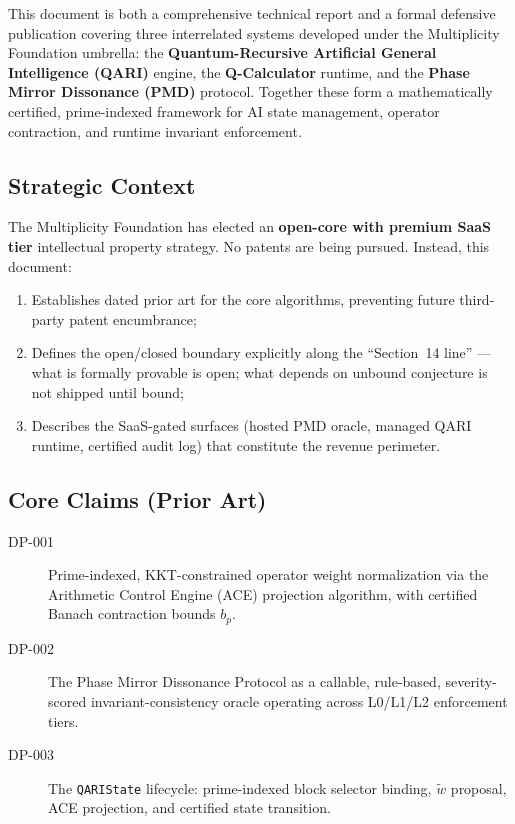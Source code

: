 \documentclass[12pt,letterpaper]{article}
\begin{document}
This document is both a comprehensive technical report and a formal
defensive publication covering three interrelated systems developed
under the Multiplicity Foundation umbrella: the
\textbf{Quantum-Recursive Artificial General Intelligence (QARI)}
engine, the \textbf{Q-Calculator} runtime, and the \textbf{Phase Mirror
Dissonance (PMD)} protocol. Together these form a mathematically
certified, prime-indexed framework for AI state management, operator
contraction, and runtime invariant enforcement.

\subsection{Strategic Context}

The Multiplicity Foundation has elected an \textbf{open-core with
premium SaaS tier} intellectual property strategy. No patents are being
pursued. Instead, this document:
\begin{enumerate}[label=\alph*.]
  \item Establishes dated prior art for the core algorithms, preventing
        future third-party patent encumbrance;
  \item Defines the open/closed boundary explicitly along the
        ``Section~14 line'' --- what is formally provable is open;
        what depends on unbound conjecture is not shipped until bound;
  \item Describes the SaaS-gated surfaces (hosted PMD oracle, managed
        QARI runtime, certified audit log) that constitute the revenue
        perimeter.
\end{enumerate}

\subsection{Core Claims (Prior Art)}

\begin{description}
  \item[DP-001] Prime-indexed, KKT-constrained operator weight
    normalization via the Arithmetic Control Engine (ACE) projection
    algorithm, with certified Banach contraction bounds $b_p$.
  \item[DP-002] The Phase Mirror Dissonance Protocol as a callable,
    rule-based, severity-scored invariant-consistency oracle operating
    across L0/L1/L2 enforcement tiers.
  \item[DP-003] The \texttt{QARIState} lifecycle: prime-indexed block
    selector binding, $\tilde{w}$ proposal, ACE projection, and
    certified state transition.
\end{description}
\end{document}
